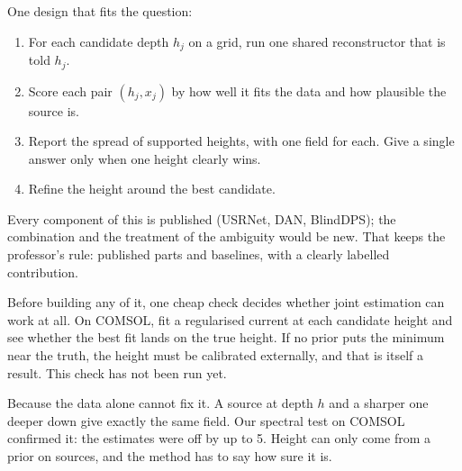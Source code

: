 One design that fits the question:
\begin{enumerate}
\item For each candidate depth $h_j$ on a grid, run one shared reconstructor that is told $h_j$.
\item Score each pair $(h_j, x_j)$ by how well it fits the data and how plausible the source is.
\item Report the spread of supported heights, with one field for each. Give a single answer only when one height clearly
wins.
\item Refine the height around the best candidate.
\end{enumerate}
Every component of this is published (USRNet, DAN, BlindDPS); the combination and the treatment of the ambiguity would be
new. That keeps the professor's rule: published parts and baselines, with a clearly labelled contribution.

Before building any of it, one cheap check decides whether joint estimation can work at all. On COMSOL, fit a regularised
current at each candidate height and see whether the best fit lands on the true height. If no prior puts the minimum near
the truth, the height must be calibrated externally, and that is itself a result. This check has not been run yet.

\begin{defend}
Because the data alone cannot fix it. A source at depth $h$ and a sharper one deeper down give exactly the same field. Our
spectral test on COMSOL confirmed it: the estimates were off by up to 5\um. Height can only come from a prior on sources,
and the method has to say how sure it is.
\end{defend}
